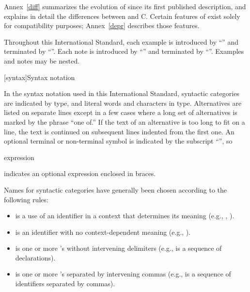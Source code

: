 \pnum
Annex~\ref{diff} summarizes the evolution of \Cpp  since its first
published description, and explains in detail the differences between
\Cpp  and C\@. Certain features of \Cpp  exist solely for compatibility
purposes; Annex~\ref{depr} describes those features.

\pnum
Throughout this International Standard, each example is introduced by
``'' and terminated by ``''. Each note is
introduced by ``'' and terminated by ``''. Examples
and notes may be nested.%

[syntax]{Syntax notation}

\pnum
{}%
In the syntax notation used in this International Standard, syntactic
categories are indicated by  type, and literal words
and characters in   type. Alternatives are
listed on separate lines except in a few cases where a long set of
alternatives is marked by the phrase ``one of.'' If the text of an alternative is too long to fit on a line, the text is continued on subsequent lines indented from the first one.
An optional terminal or non-terminal symbol is indicated by the subscript
``\opt'', so

\begin{ncbnf}
\terminal{\{} expression\opt{} \terminal{\}}
\end{ncbnf}

indicates an optional expression enclosed in braces.%

\pnum
Names for syntactic categories have generally been chosen according to
the following rules:
\begin{itemize}
\item {} is a use of an identifier in a context that
determines its meaning (e.g., ,
).
\item {} is an identifier with no context-dependent meaning
(e.g., ).
\item {} is one or more 's without intervening
delimiters (e.g.,  is a sequence of
declarations).
\item {} is one or more 's separated by
intervening commas (e.g.,  is a sequence of
identifiers separated by commas).
\end{itemize}%

